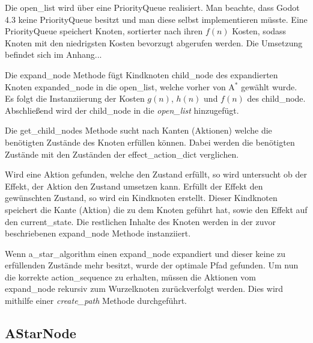 

Die open\_list wird über eine PriorityQueue realisiert. Man beachte, dass Godot 4.3 keine PriorityQueue besitzt und man diese selbst implementieren müsste. Eine PriorityQueue speichert Knoten, sortierter nach ihren $f(n)$ Kosten, sodass Knoten mit den niedrigsten Kosten bevorzugt abgerufen werden. Die Umsetzung befindet sich im Anhang...

Die expand\_node Methode fügt Kindknoten child\_node des expandierten Knoten expanded\_node in die open\_list, welche vorher von A$^*$ gewählt wurde. Es folgt die Instanziierung der Kosten $g(n)$, $h(n)$ und $f(n)$ des child\_node. Abschließend wird der child\_node in die \textit{open\_list} hinzugefügt.



Die get\_child\_nodes Methode sucht nach Kanten (Aktionen) welche die benötigten Zustände des Knoten erfüllen können. Dabei werden die benötigten Zustände mit den Zuständen der effect\_action\_dict verglichen.

Wird eine Aktion gefunden, welche den Zustand erfüllt, so wird untersucht ob der Effekt, der Aktion den Zustand umsetzen kann. Erfüllt der Effekt den gewünschten Zustand, so wird ein Kindknoten erstellt. Dieser Kindknoten speichert die Kante (Aktion) die zu dem Knoten geführt hat, sowie den Effekt auf den current\_state. Die restlichen Inhalte des Knoten werden in der zuvor beschriebenen expand\_node Methode instanziiert.

%

Wenn a\_star\_algorithm einen expand\_node expandiert und dieser keine zu erfüllenden Zustände mehr besitzt, wurde der optimale Pfad gefunden. Um nun die korrekte action\_sequence zu erhalten, müssen die Aktionen vom expand\_node rekursiv zum Wurzelknoten zurückverfolgt werden. Dies wird mithilfe einer \textit{create\_path} Methode durchgeführt.


\subsection{AStarNode}

